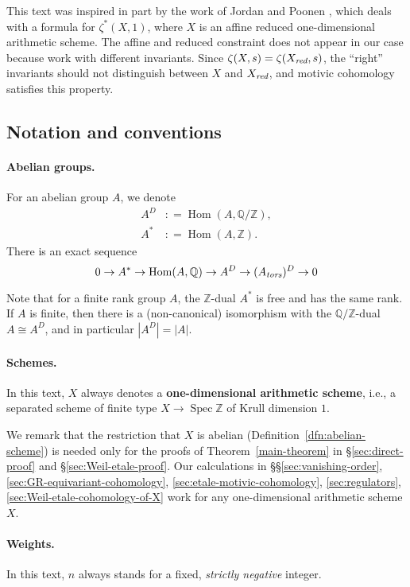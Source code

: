\documentclass[draft]{article}
\DeclareMathOperator{\Hom}{Hom}
\DeclareMathOperator{\Spec}{Spec}
\newcommand{\QQ}{\mathbb{Q}}
\newcommand{\ZZ}{\mathbb{Z}}
\newcommand{\red}{\text{\it red}}
\newcommand{\tors}{\text{\it tors}}
\newcommand{\dfn}{\mathrel{\mathop:}=}
\theoremstyle{myplain}
\theoremstyle{mydefinition}
\begin{document}
This text was inspired in part by the work of Jordan and Poonen
\cite{Jordan-Poonen-2020}, which deals with a formula for $\zeta^* (X,1)$, where
$X$ is an affine reduced one-dimensional arithmetic scheme. The affine and
reduced constraint does not appear in our case because work with different
invariants. Since $\zeta (X,s) = \zeta (X_\red, s)$, the ``right'' invariants
should not distinguish between $X$ and $X_\red$, and motivic cohomology
satisfies this property.

\subsection*{Notation and conventions}

\paragraph{Abelian groups.}
For an abelian group $A$, we denote
\begin{align*}
  A^D & \dfn \Hom (A, \QQ/\ZZ), \\
  A^* & \dfn \Hom (A, \ZZ).
\end{align*}
There is an exact sequence
\begin{equation}
  \label{eqn:exact-sequence-A*-etc}
  0 \to A^* \to \Hom (A,\QQ) \to A^D \to (A_\tors)^D \to 0
\end{equation}

Note that for a finite rank group $A$, the $\ZZ$-dual $A^*$ is free and has the same
rank. If $A$ is finite, then there is a (non-canonical) isomorphism with the
$\QQ/\ZZ$-dual $A \cong A^D$, and in particular $|A^D| = |A|$.

\paragraph{Schemes.}
In this text, $X$ always denotes a \textbf{one-dimensional arithmetic scheme},
i.e., a separated scheme of finite type $X \to \Spec \ZZ$ of Krull dimension
$1$.

We remark that the restriction that $X$ is abelian
(Definition~\ref{dfn:abelian-scheme}) is needed only for the
proofs of Theorem~\ref{main-theorem} in \S\ref{sec:direct-proof} and
\S\ref{sec:Weil-etale-proof}. Our calculations in
\S\S\ref{sec:vanishing-order},
\ref{sec:GR-equivariant-cohomology},
\ref{sec:etale-motivic-cohomology},
\ref{sec:regulators},
\ref{sec:Weil-etale-cohomology-of-X}
work for any one-dimensional arithmetic scheme $X$.

\paragraph{Weights.}
In this text, $n$ always stands for a fixed, \emph{strictly negative} integer.
\end{document}
